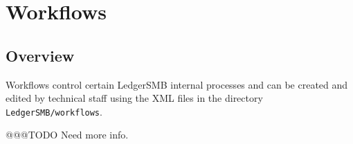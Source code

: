
\part{Workflows}
\label{part-workflows}

\chapter{Overview}
\label{cha-workflows-overview}

Workflows  control certain LedgerSMB internal processes and can be created and edited by technical staff using the XML files in the directory \texttt{LedgerSMB/workflows}.

@@@TODO Need more info.